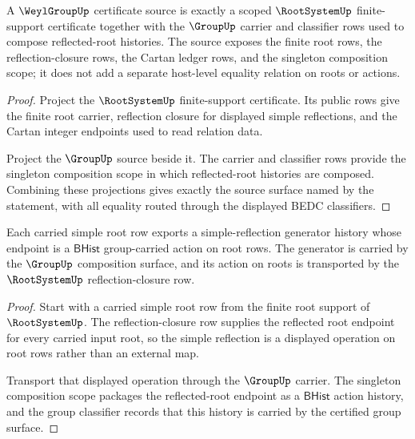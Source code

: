 \begin{theorem}
\label{thm:weylgroup-root-system-source-obligation}
A $\WeylGroupUp$ certificate source is exactly a scoped
$\RootSystemUp$ finite-support certificate together with the $\GroupUp$
carrier and classifier rows used to compose reflected-root histories. The
source exposes the finite root rows, the reflection-closure rows, the Cartan
ledger rows, and the singleton composition scope; it does not add a separate
host-level equality relation on roots or actions.
\end{theorem}
\begin{proof}
Project the $\RootSystemUp$ finite-support certificate. Its public rows give
the finite root carrier, reflection closure for displayed simple reflections,
and the Cartan integer endpoints used to read relation data.

Project the $\GroupUp$ source beside it. The carrier and classifier rows
provide the singleton composition scope in which reflected-root histories are
composed. Combining these projections gives exactly the source surface named
by the statement, with all equality routed through the displayed BEDC
classifiers.
\end{proof}

\begin{theorem}
\label{thm:weylgroup-simple-reflection-carrier-obligation}
Each carried simple root row exports a simple-reflection generator history
whose endpoint is a $\mathsf{BHist}$ group-carried action on root rows. The
generator is carried by the $\GroupUp$ composition surface, and its action on
roots is transported by the $\RootSystemUp$ reflection-closure row.
\end{theorem}
\begin{proof}
Start with a carried simple root row from the finite root support of
$\RootSystemUp$. The reflection-closure row supplies the reflected root
endpoint for every carried input root, so the simple reflection is a displayed
operation on root rows rather than an external map.

Transport that displayed operation through the $\GroupUp$ carrier. The
singleton composition scope packages the reflected-root endpoint as a
$\mathsf{BHist}$ action history, and the group classifier records that this
history is carried by the certified group surface.
\end{proof}

